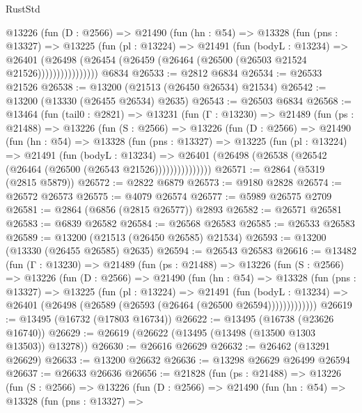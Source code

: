 \begin{lexlean}{RustStd}
\begin{coremodule}
            @13226
              (fun (D : @2566) =>
              @21490
                (fun (hn : @54) =>
                @13328
                  (fun (pns : @13327) =>
                  @13225
                    (fun (pl : @13224) =>
                    @21491
                      (fun (bodyL : @13234) =>
                      @26401
                        (@26498
                          (@26454 (@26459 (@26464 (@26500 (@26503 @21524 @21526))))))))))))))))
    @6834
@26533 := @2812 @6834
@26534 := @26533 @21526
@26538 := @13200 (@21513 (@26450 @26534) @21534)
@26542 := @13200 (@13330 (@26455 @26534) @2635)
@26543 := @26503 @6834
@26568 := @13464
    (fun (tail0 : @2821) =>
    @13231
      (fun (Γ : @13230) =>
      @21489
        (fun (ps : @21488) =>
        @13226
          (fun (S : @2566) =>
          @13226
            (fun (D : @2566) =>
            @21490
              (fun (hn : @54) =>
              @13328
                (fun (pns : @13327) =>
                @13225
                  (fun (pl : @13224) =>
                  @21491
                    (fun (bodyL : @13234) =>
                    @26401 (@26498 (@26538 (@26542 (@26464 (@26500 (@26543 @21526)))))))))))))))
@26571 := @2864 (@5319 (@2815 @5879))
@26572 := @2822 @6879
@26573 := @9180 @2828
@26574 := @26572 @26573
@26575 := @4079 @26574
@26577 := @5989 @26575 @2709
@26581 := @2864 (@6856 (@2815 @26577)) @2893
@26582 := @26571 @26581
@26583 := @6839 @26582
@26584 := @26568 @26583
@26585 := @26533 @26583
@26589 := @13200 (@21513 (@26450 @26585) @21534)
@26593 := @13200 (@13330 (@26455 @26585) @2635)
@26594 := @26543 @26583
@26616 := @13482
    (fun (Γ : @13230) =>
    @21489
      (fun (ps : @21488) =>
      @13226
        (fun (S : @2566) =>
        @13226
          (fun (D : @2566) =>
          @21490
            (fun (hn : @54) =>
            @13328
              (fun (pns : @13327) =>
              @13225
                (fun (pl : @13224) =>
                @21491
                  (fun (bodyL : @13234) =>
                  @26401 (@26498 (@26589 (@26593 (@26464 (@26500 @26594)))))))))))))
@26619 := @13495 (@16732 (@17803 @16734))
@26622 := @13495 (@16738 (@23626 @16740))
@26629 := @26619 (@26622 (@13495 (@13498 (@13500 @1303 @13503)) @13278))
@26630 := @26616 @26629
@26632 := @26462 (@13291 @26629)
@26633 := @13200 @26632
@26636 := @13298 @26629 @26499 @26594
@26637 := @26633 @26636
@26656 := @21828
    (fun (ps : @21488) =>
    @13226
      (fun (S : @2566) =>
      @13226
        (fun (D : @2566) =>
        @21490
          (fun (hn : @54) =>
          @13328
            (fun (pns : @13327) =>

\end{coremodule}
\end{lexlean}

